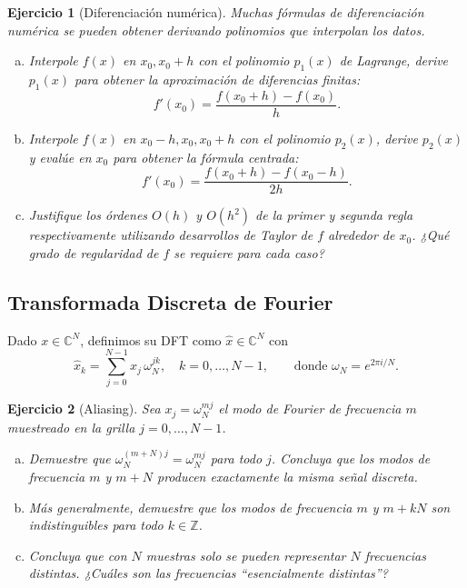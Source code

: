 \documentclass[12pt]{article}
\newtheorem{exercise}{Ejercicio}
\begin{document}
\begin{exercise}[Diferenciación numérica]
Muchas fórmulas de diferenciación numérica se pueden obtener derivando polinomios que interpolan los datos.
\begin{enumerate}[(a)]
\item Interpole $f(x)$ en $x_0, x_0 + h$ con el polinomio $p_1(x)$ de Lagrange, derive $p_1(x)$ para obtener la aproximación de diferencias finitas:
\[
f'(x_0) = \frac{f(x_0 + h) - f(x_0)}{h}.
\]
\item Interpole $f(x)$ en $x_0 - h, x_0, x_0 + h$ con el polinomio $p_2(x)$, derive $p_2(x)$ y evalúe en $x_0$ para obtener la fórmula centrada:
\[
f'(x_0) = \frac{f(x_0 + h) - f(x_0 - h)}{2h}.
\]
\item Justifique los órdenes $O(h)$ y $O(h^2)$ de la primer y segunda regla respectivamente utilizando desarrollos de Taylor de $f$ alrededor de $x_0$. ¿Qué grado de regularidad de $f$ se requiere para cada caso?
\end{enumerate}
\end{exercise} 

\subsection*{Transformada Discreta de Fourier}

Dado $x \in \mathbb{C}^N$, definimos su DFT como $\hat{x} \in \mathbb{C}^N$ con
\[
\hat{x}_k = \sum_{j=0}^{N-1} x_j\, \omega_N^{jk}, \quad k = 0, \ldots, N-1, \qquad \text{donde } \omega_N = e^{2\pi i/N}.
\]

\begin{exercise}[Aliasing]
Sea $x_j = \omega_N^{mj}$ el modo de Fourier de frecuencia $m$ muestreado en la grilla $j = 0, \ldots, N-1$.
\begin{enumerate}[(a)]
\item Demuestre que $\omega_N^{(m+N)j} = \omega_N^{mj}$ para todo $j$. Concluya que los modos de frecuencia $m$ y $m + N$ producen exactamente la misma señal discreta.
\item Más generalmente, demuestre que los modos de frecuencia $m$ y $m + kN$ son indistinguibles para todo $k \in \mathbb{Z}$.
\item Concluya que con $N$ muestras solo se pueden representar $N$ frecuencias distintas. ¿Cuáles son las frecuencias ``esencialmente distintas''?
\end{enumerate}
\end{exercise}
\end{document}
